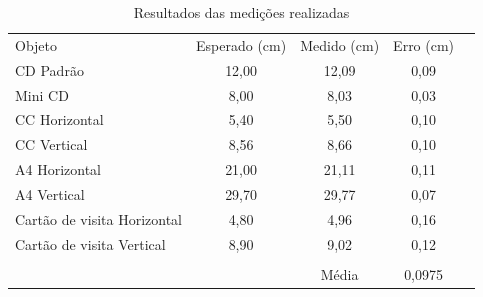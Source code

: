 \documentclass[12pt]{article}
\begin{document}
	\begin{table}[]
		\begin{tabular}{lcccl}
			\cline{1-4}
			\multicolumn{1}{|l|}{Objeto}                      & \multicolumn{1}{c|}{Esperado (cm)} & \multicolumn{1}{c|}{Medido (cm)} & \multicolumn{1}{c|}{Erro (cm)} &  \\ \cline{1-4}
			\multicolumn{1}{|l|}{CD Padrão}                   & \multicolumn{1}{c|}{12,00}         & \multicolumn{1}{c|}{12,09}       & \multicolumn{1}{c|}{0,09}      &  \\ \cline{1-4}
			\multicolumn{1}{|l|}{Mini CD}                     & \multicolumn{1}{c|}{8,00}          & \multicolumn{1}{c|}{8,03}        & \multicolumn{1}{c|}{0,03}      &  \\ \cline{1-4}
			\multicolumn{1}{|l|}{CC Horizontal}               & \multicolumn{1}{c|}{5,40}          & \multicolumn{1}{c|}{5,50}        & \multicolumn{1}{c|}{0,10}      &  \\ \cline{1-4}
			\multicolumn{1}{|l|}{CC Vertical}                 & \multicolumn{1}{c|}{8,56}          & \multicolumn{1}{c|}{8,66}        & \multicolumn{1}{c|}{0,10}      &  \\ \cline{1-4}
			\multicolumn{1}{|l|}{A4 Horizontal}               & \multicolumn{1}{c|}{21,00}         & \multicolumn{1}{c|}{21,11}       & \multicolumn{1}{c|}{0,11}      &  \\ \cline{1-4}
			\multicolumn{1}{|l|}{A4 Vertical}                 & \multicolumn{1}{c|}{29,70}         & \multicolumn{1}{c|}{29,77}       & \multicolumn{1}{c|}{0,07}      &  \\ \cline{1-4}
			\multicolumn{1}{|l|}{Cartão de visita Horizontal} & \multicolumn{1}{c|}{4,80}          & \multicolumn{1}{c|}{4,96}        & \multicolumn{1}{c|}{0,16}      &  \\ \cline{1-4}
			\multicolumn{1}{|l|}{Cartão de visita Vertical}   & \multicolumn{1}{c|}{8,90}          & \multicolumn{1}{c|}{9,02}        & \multicolumn{1}{c|}{0,12}      &  \\ \cline{1-4}
			\multicolumn{1}{c}{}                              &                                    &                                  &                                &  \\ \cline{3-4}
			\multicolumn{1}{c}{}                              & \multicolumn{1}{c|}{}              & \multicolumn{1}{c|}{Média}       & \multicolumn{1}{c|}{0,0975}    &  \\ \cline{3-4}
		\end{tabular}
		\caption{Resultados das medições realizadas}
		\label{t4}
	\end{table}
		
\end{document}
